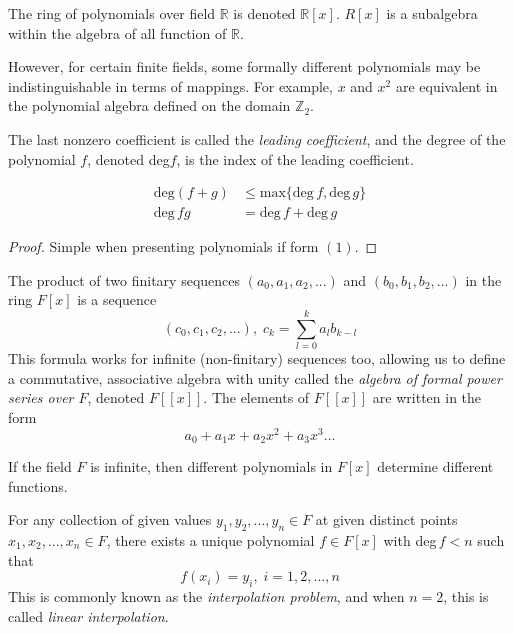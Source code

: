 \documentclass{article}
\begin{document}
      The ring of polynomials over field $\mathbb{R}$ is denoted $\mathbb{R}[x]$. $R[x]$ is a subalgebra within the algebra of all function of $\mathbb{R}$. 

      However, for certain finite fields, some formally different polynomials may be indistinguishable in terms of mappings. For example, $x$ and $x^2$ are equivalent in the polynomial algebra defined on the domain $\mathbb{Z}_2$.

      \begin{definition}
        The last nonzero coefficient is called the \textit{leading coefficient}, and the degree of the polynomial $f$, denoted deg$f$, is the index of the leading coefficient. 
      \end{definition}

      \begin{theorem}
      \begin{align}
        \text{deg}(f+g) & \leq \text{max}\{\text{deg}\,f, \text{deg} \,g\} \\
        \text{deg} \,f g & = \text{deg} \,f + \text{deg} \,g
      \end{align}
      \end{theorem}
      \begin{proof}
        Simple when presenting polynomials if form $(1)$. 
      \end{proof}

      \begin{definition}
        The product of two finitary sequences $(a_0, a_1, a_2, ...)$ and $(b_0, b_1, b_2, ...)$ in the ring $F[x]$ is a sequence 
        \[ (c_0, c_1, c_2, ...), \; c_k = \sum_{l = 0}^{k} a_l b_{k-l}\]
        This formula works for infinite (non-finitary) sequences too, allowing us to define a commutative, associative algebra with unity called the \textit{algebra of formal power series over $F$}, denoted $F[[x]]$. The elements of $F[[x]]$ are written in the form 
        \[ a_0 + a_1 x + a_2 x^2 + a_3 x^3...\]
      \end{definition}

      \begin{theorem}
        If the field $F$ is infinite, then different polynomials in $F[x]$ determine different functions. 
      \end{theorem}

      \begin{theorem}
        For any collection of given values $y_1, y_2, ..., y_n \in F$ at given distinct points $x_1, x_2, ..., x_n \in F$, there exists a unique polynomial $f \in F[x]$ with deg$\, f < n$ such that
        \[ f(x_i) = y_i, \; i = 1, 2, ..., n\]
        This is commonly known as the \textit{interpolation problem}, and when $n = 2$, this is called \textit{linear interpolation}. 
      \end{theorem}
\end{document}
